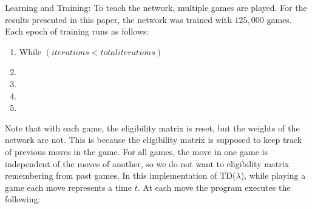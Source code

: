 \documentclass{sig-alternate-05-2015}
\begin{document}
Learning and Training:
To teach the network, multiple games are played. For the results presented in this paper, the network was trained with $125,000$ games. Each epoch of training runs as follows:

\begin{enumerate}
\itemsep0em 
\item While $(iterations < total iterations)$
\item  \hspace*{.5cm}
\item  \hspace*{1cm}
\item  \hspace*{.5cm}
\item   \hspace*{1cm}
\end{enumerate}


Note that with each game, the eligibility matrix is reset, but the weights of the network are not. This is because the eligibility matrix is supposed to keep track of previous moves in the game. For all games, the move in one game is independent of the moves of another, so we do not want to eligibility matrix remembering from past games. In this implementation of TD($\lambda$), while playing a game each move represents a time $t$. At each move the program executes the following:
\end{document}
